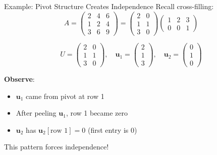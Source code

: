\documentclass[10pt]{beamer}
\theoremstyle{definition}
\begin{document}
\begin{frame}[fragile]{Example: Pivot Structure Creates Independence}
Recall cross-filling:
$$A = \begin{pmatrix} 2 & 4 & 6 \\ 1 & 2 & 4 \\ 3 & 6 & 9 \end{pmatrix} = \begin{pmatrix} 2 & 0 \\ 1 & 1 \\ 3 & 0 \end{pmatrix}\begin{pmatrix} 1 & 2 & 3 \\ 0 & 0 & 1 \end{pmatrix}$$

\vfill
$$U = \begin{pmatrix} 2 & 0 \\ 1 & 1 \\ 3 & 0 \end{pmatrix}, \quad \mathbf{u}_1 = \begin{pmatrix} 2 \\ 1 \\ 3 \end{pmatrix}, \quad \mathbf{u}_2 = \begin{pmatrix} 0 \\ 1 \\ 0 \end{pmatrix}$$

\vfill
\textbf{Observe}:
\begin{itemize}
\item $\mathbf{u}_1$ came from pivot at row 1
\item After peeling $\mathbf{u}_1$, row 1 became zero
\item $\mathbf{u}_2$ has $\mathbf{u}_2[\text{row } 1] = 0$ (first entry is 0)
\end{itemize}

This pattern forces independence!
\end{frame}
\end{document}
